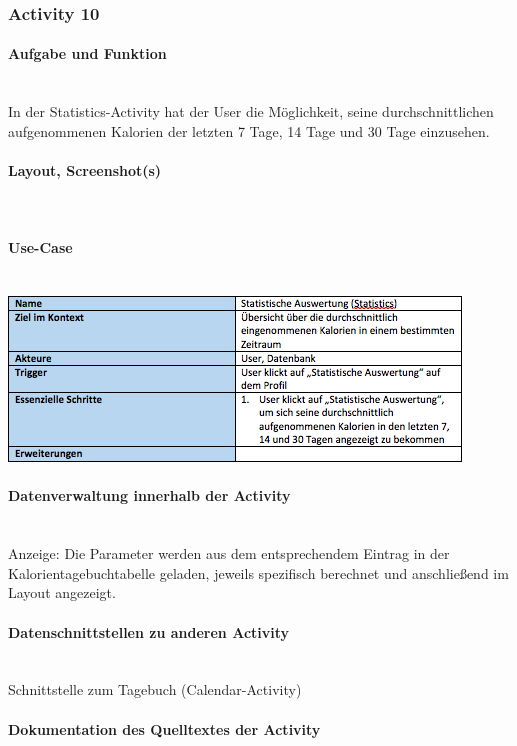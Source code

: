 \subsubsection{Activity 10}

\paragraph{Aufgabe und Funktion}\\
In der Statistics-Activity hat der User die Möglichkeit, seine durchschnittlichen aufgenommenen Kalorien der letzten 7 Tage, 14 Tage und 30 Tage einzusehen. 

\paragraph{Layout, Screenshot(s)}\\
\paragraph{Use-Case}$~~$\\
\newline
\includegraphics[scale=1]{img/usecasestatistics}\\
\paragraph{Datenverwaltung innerhalb der Activity}\\
Anzeige: Die Parameter werden aus dem entsprechendem Eintrag in der Kalorientagebuchtabelle geladen, jeweils spezifisch berechnet und anschließend im Layout angezeigt. 

\paragraph{Datenschnittstellen zu anderen Activity}\\
Schnittstelle zum Tagebuch (Calendar-Activity)

\paragraph{Dokumentation des Quelltextes der Activity}\\

